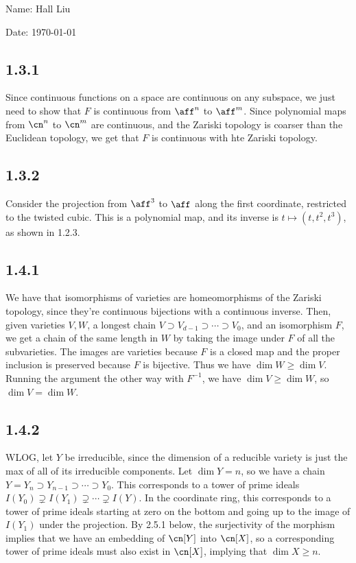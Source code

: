 \documentclass{article}
\begin{document}
Name: Hall Liu

Date: \today 
\vspace{1.5cm}
\subsection*{1.3.1}
Since continuous functions on a space are continuous on any subspace, we just need to show that $F$ is continuous from $\aff^n$ to $\aff^m$. Since polynomial maps from $\cn^n$ to $\cn^m$ are continuous, and the Zariski topology is coarser than the Euclidean topology, we get that $F$ is continuous with hte Zariski topology.
\subsection*{1.3.2}
Consider the projection from $\aff^3$ to $\aff$ along the first coordinate, restricted to the twisted cubic. This is a polynomial map, and its inverse is $t\mapsto(t,t^2,t^3)$, as shown in 1.2.3. 
\subsection*{1.4.1}
We have that isomorphisms of varieties are homeomorphisms of the Zariski topology, since they're continuous bijections with a continuous inverse. Then, given varieties $V,W$, a longest chain $V\supset V_{d-1}\supset\cdots\supset V_0$, and an isomorphism $F$, we get a chain of the same length in $W$ by taking the image under $F$ of all the subvarieties. The images are varieties because $F$ is a closed map and the proper inclusion is preserved because $F$ is bijective. Thus we have $\dim W\geq\dim V$. Running the argument the other way with $F^{-1}$, we have $\dim V\geq\dim W$, so $\dim V=\dim W$.
\subsection*{1.4.2}
WLOG, let $Y$ be irreducible, since the dimension of a reducible variety is just the max of all of its irreducible components. Let $\dim Y=n$, so we have a chain $Y=Y_n\supset Y_{n-1}\supset\cdots\supset Y_0$. This corresponds to a tower of prime ideals $I(Y_0)\supsetneq I(Y_1)\supsetneq\cdots\supsetneq I(Y)$. In the coordinate ring, this corresponds to a tower of prime ideals starting at zero on the bottom and going up to the image of $I(Y_1)$ under the projection. By 2.5.1 below, the surjectivity of the morphism implies that we have an embedding of $\cn[Y]$ into $\cn[X]$, so a corresponding tower of prime ideals must also exist in $\cn[X]$, implying that $\dim X\geq n$.
\end{document}
